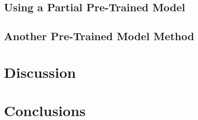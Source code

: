 \subsection{Using a Partial Pre-Trained Model}

\subsection{Another Pre-Trained Model Method}

\section{Discussion}



\section{Conclusions}

